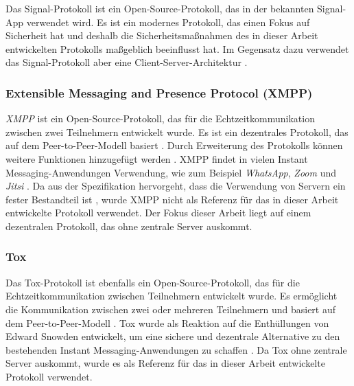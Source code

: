Das Signal-Protokoll ist ein Open-Source-Protokoll, das in der bekannten Signal-App verwendet wird. Es ist ein modernes Protokoll, das einen Fokus auf Sicherheit hat \parencite{Signal_website} und deshalb die Sicherheitsmaßnahmen des in dieser Arbeit entwickelten Protokolls maßgeblich beeinflusst hat. Im Gegensatz dazu verwendet das Signal-Protokoll aber eine Client-Server-Architektur \parencite{Github_libsignal}.

\subsubsection{Extensible Messaging and Presence Protocol (XMPP)}
\label{subsubsection:xmpp}

\textit{XMPP} ist ein Open-Source-Protokoll, das für die Echtzeitkommunikation zwischen zwei Teilnehmern entwickelt wurde. Es ist ein dezentrales Protokoll, das auf dem Peer-to-Peer-Modell basiert \parencite{rfc6120_XMPP}. Durch Erweiterung des Protokolls können weitere Funktionen hinzugefügt werden \parencite{xmpp_extensions}. XMPP findet in vielen Instant Messaging-Anwendungen Verwendung, wie zum Beispiel \textit{WhatsApp}, \textit{Zoom} und \textit{Jitsi} \parencite{xmpp_im}. Da aus der Spezifikation hervorgeht, dass die Verwendung von Servern ein fester Bestandteil ist \parencite{rfc6120_XMPP}, wurde XMPP nicht als Referenz für das in dieser Arbeit entwickelte Protokoll verwendet. Der Fokus dieser Arbeit liegt auf einem dezentralen Protokoll, das ohne zentrale Server auskommt.


\subsubsection{Tox}
\label{subsubsection:tox}

Das Tox-Protokoll ist ebenfalls ein Open-Source-Protokoll, das für die Echtzeitkommunikation zwischen Teilnehmern entwickelt wurde. Es ermöglicht die Kommunikation zwischen zwei oder mehreren Teilnehmern und basiert auf dem Peer-to-Peer-Modell \parencite{Tox_FAQ}. Tox wurde als Reaktion auf die Enthüllungen von Edward Snowden entwickelt, um eine sichere und dezentrale Alternative zu den bestehenden Instant Messaging-Anwendungen zu schaffen \parencite{tox_about}. Da Tox ohne zentrale Server auskommt, wurde es als Referenz für das in dieser Arbeit entwickelte Protokoll verwendet.



